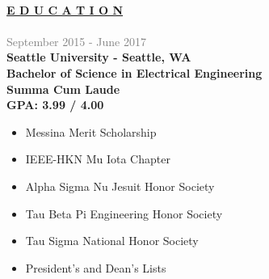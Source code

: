 \documentclass[letterpage]{article}
\begin{document}
\vspace*{10px}\\ %
\begin{minipage}[t]{0.424\linewidth}
\vspace{0pt}

\textbf{\fontsize{14px}{1px}\selectfont
  \ul{E D U C A T I O N}
}\\
\vspace{5px}\\
\textcolor{gray}{September 2015 - June 2017}\\
\textbf{\textsf{Seattle University - Seattle, WA}}\\
\textbf{Bachelor of Science in Electrical Engineering}\\
\textbf{Summa Cum Laude}\\
\textbf{GPA: 3.99 / 4.00}
\begin{itemize}[leftmargin=*,labelindent=5mm,labelsep=7mm]
\renewcommand\labelitemi{\rule[1mm]{0.33mm}{0.33mm}}
\renewcommand\labelitemii{$\blacksquare$}
\item
  Messina Merit Scholarship

\item
  IEEE-HKN Mu Iota Chapter
  {}
\item
  Alpha Sigma Nu Jesuit Honor Society
  {}
\item
  Tau Beta Pi Engineering Honor Society
\item
  Tau Sigma National Honor Society
\item
  President's and Dean's Lists
  {}
\end{itemize}
\vspace{7px}


\end{minipage}
\end{document}
